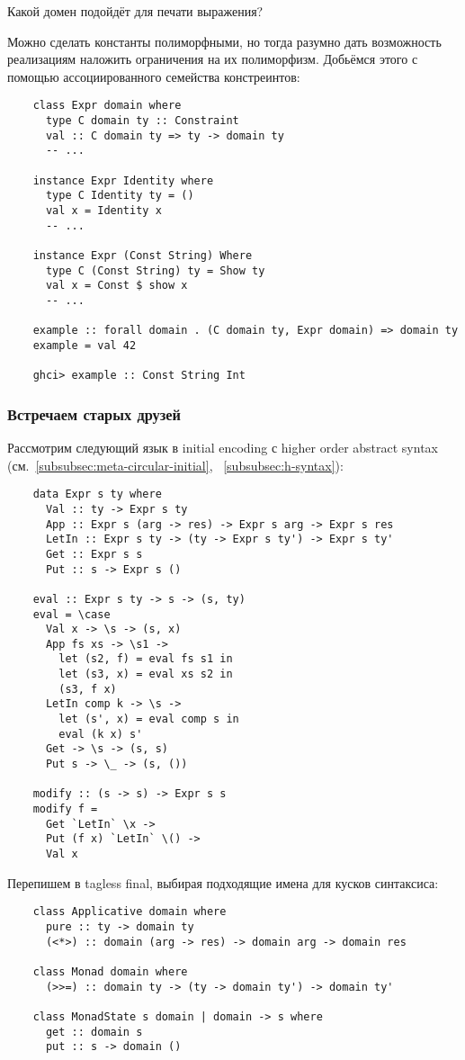 \begin{task}
    Какой домен подойдёт для печати выражения?
\end{task}

Можно сделать константы полиморфными, но тогда разумно дать возможность реализациям наложить ограничения на их полиморфизм.
Добьёмся этого с помощью ассоциированного семейства констреинтов:
\begin{verbatim}
    class Expr domain where
      type C domain ty :: Constraint
      val :: C domain ty => ty -> domain ty
      -- ...

    instance Expr Identity where
      type C Identity ty = ()
      val x = Identity x
      -- ...

    instance Expr (Const String) Where
      type C (Const String) ty = Show ty
      val x = Const $ show x
      -- ...

    example :: forall domain . (C domain ty, Expr domain) => domain ty
    example = val 42

    ghci> example :: Const String Int
\end{verbatim}

\subsubsection{Встречаем старых друзей}

Рассмотрим следующий язык в initial encoding с higher order abstract syntax (см.~\ref{subsubsec:meta-circular-initial}, ~\ref{subsubsec:h-syntax}):
\begin{verbatim}
    data Expr s ty where
      Val :: ty -> Expr s ty
      App :: Expr s (arg -> res) -> Expr s arg -> Expr s res
      LetIn :: Expr s ty -> (ty -> Expr s ty') -> Expr s ty'
      Get :: Expr s s
      Put :: s -> Expr s ()

    eval :: Expr s ty -> s -> (s, ty)
    eval = \case
      Val x -> \s -> (s, x)
      App fs xs -> \s1 ->
        let (s2, f) = eval fs s1 in
        let (s3, x) = eval xs s2 in
        (s3, f x)
      LetIn comp k -> \s ->
        let (s', x) = eval comp s in
        eval (k x) s'
      Get -> \s -> (s, s)
      Put s -> \_ -> (s, ())

    modify :: (s -> s) -> Expr s s
    modify f =
      Get `LetIn` \x ->
      Put (f x) `LetIn` \() ->
      Val x
\end{verbatim}

Перепишем в tagless final, выбирая подходящие имена для кусков синтаксиса:
\begin{verbatim}
    class Applicative domain where
      pure :: ty -> domain ty
      (<*>) :: domain (arg -> res) -> domain arg -> domain res

    class Monad domain where
      (>>=) :: domain ty -> (ty -> domain ty') -> domain ty'

    class MonadState s domain | domain -> s where
      get :: domain s
      put :: s -> domain ()
\end{verbatim}


